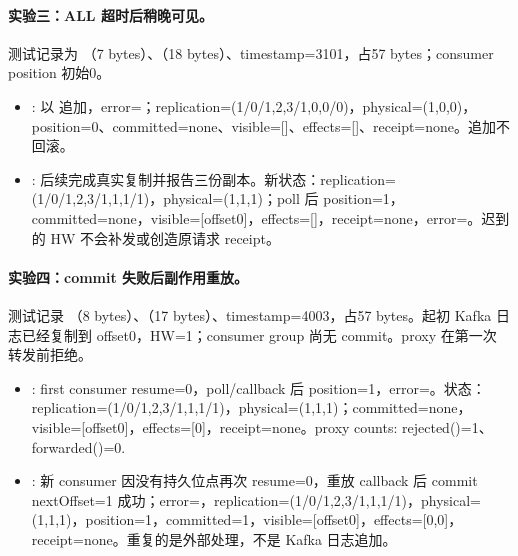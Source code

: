 \paragraph{实验三：ALL 超时后稍晚可见。}测试记录为 （7 bytes）、（18 bytes）、timestamp=3101，占57 bytes；consumer position 初始0。
\begin{itemize}
\item {}: 以  追加，error=；replication=(1/0/{1,2,3}/{1,0,0}/0)，physical=(1,0,0)，position=0、committed=none、visible=[]、effects=[]、receipt=none。追加不回滚。
\item {}: 后续完成真实复制并报告三份副本。\newline 新状态：replication=(1/0/{1,2,3}/{1,1,1}/1)，physical=(1,1,1)；\newline poll 后 position=1，committed=none，visible=[offset0]，effects=[]，receipt=none，error=。迟到的 HW 不会补发或创造原请求 receipt。
\end{itemize}
\paragraph{实验四：commit 失败后副作用重放。}测试记录 （8 bytes）、（17 bytes）、timestamp=4003，占57 bytes。起初 Kafka 日志已经复制到 offset0，HW=1；consumer group 尚无 commit。proxy 在第一次  转发前拒绝。
\begin{itemize}
\item {}: first consumer resume=0，poll/callback 后 position=1，error=。\newline 状态：replication=(1/0/{1,2,3}/{1,1,1}/1)，physical=(1,1,1)；\newline committed=none，visible=[offset0]，effects=[0]，receipt=none。proxy counts: rejected()=1、forwarded()=0.
\item {}: 新 consumer 因没有持久位点再次 resume=0，重放 callback 后 commit nextOffset=1 成功；error=，replication=(1/0/{1,2,3}/{1,1,1}/1)，physical=(1,1,1)，position=1，committed=1，visible=[offset0]，effects=[0,0]，receipt=none。重复的是外部处理，不是 Kafka 日志追加。
\end{itemize}

